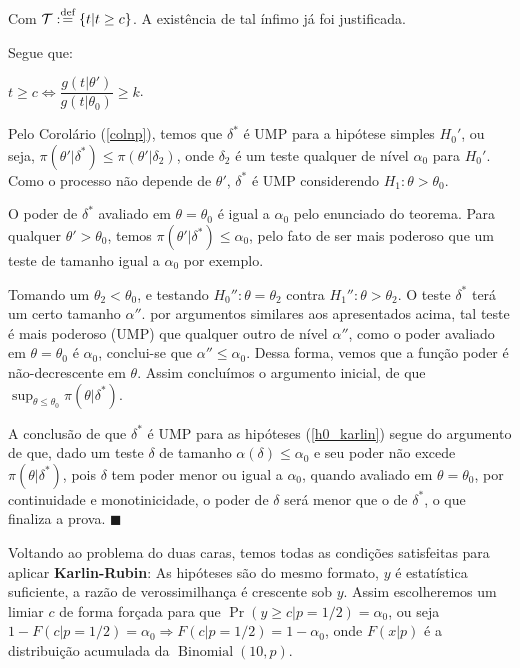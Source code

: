 \documentclass[a4paper,10pt, notitlepage]{report}
\newcommand{\pow}{^}%
\newcommand{\pr}{\operatorname{Pr}} %
\newcommand{\defn}{\stackrel{\textrm{\scriptsize def}}{=}}
\newcommand{\op}{\operatorname}
\begin{document}
\begin{enumerate}
	Com $\mathcal{T}:\defn\{t|t\geq c\}$. A existência de tal ínfimo já foi justificada.
	
	Segue que:
	
	$t\geq c\Leftrightarrow \dfrac{g(t|\theta')}{g(t|\theta_0)}\geq k$.
	
	
	\citep{scharf1991statistical}Pelo Corolário (\ref{colnp}), temos que $\delta\pow*$ é UMP para a hipótese simples $H_0'$, ou seja, $\pi(\theta'|\delta\pow*)\leq\pi(\theta'|\delta_2)$, onde $\delta_2$ é um teste qualquer de nível $\alpha_0$ para $H_0'$. Como o processo não depende de $\theta'$, $\delta\pow*$ é UMP considerendo $H_1:\theta>\theta_0$.
	
	O poder de $\delta\pow*$ avaliado em $\theta=\theta_0$ é igual a $\alpha_0$ pelo enunciado do teorema. Para qualquer $\theta'>\theta_0$, temos $\pi(\theta'|\delta\pow*)\leq\alpha_0$, pelo fato de ser mais poderoso que um teste de tamanho igual a $\alpha_0$ por exemplo.
	
	Tomando um $\theta_2<\theta_0$, e testando $H_0'':\theta=\theta_2$ contra $H_1'':\theta>\theta_2$. O teste $\delta\pow*$ terá um certo tamanho $\alpha''$.  por argumentos similares aos apresentados acima, tal teste é mais poderoso (UMP) que qualquer outro de nível $\alpha''$, como o poder avaliado em $\theta=\theta_0$ é $\alpha_0$, conclui-se que $\alpha''\leq\alpha_0$. Dessa forma, vemos que a função poder é não-decrescente em $\theta$. Assim concluímos o argumento inicial, de que $\sup_{\theta\leq\theta_0}\pi(\theta|\delta\pow*)$.
	
	A conclusão de que $\delta\pow*$ é UMP para as hipóteses (\ref{h0_karlin}) segue do argumento de que, dado um teste $\delta$ de tamanho $\alpha(\delta)\leq\alpha_0$ e seu poder não excede $\pi(\theta|\delta\pow*)$, pois $\delta$ tem poder menor ou igual a $\alpha_0$, quando avaliado em $\theta=\theta_0$, por continuidade e monotinicidade, o poder de $\delta$ será menor que o de $\delta\pow*$, o que finaliza a prova. $\blacksquare$
	
	
	Voltando ao problema do duas caras, temos todas as condições satisfeitas para aplicar \textbf{Karlin-Rubin}: As hipóteses são do mesmo formato, $y$ é estatística suficiente, a razão de verossimilhança é crescente sob $y$. Assim escolheremos um limiar $c$ de forma forçada para que $\pr(y\geq c|p=1/2)=\alpha_0$, ou seja $1-F(c|p=1/2)=\alpha_0\Rightarrow F(c|p=1/2)=1-\alpha_0$, onde $F(x|p)$ é a distribuição acumulada da $\op{Binomial}(10,p)$.
	
	\begin{table}[!htb]
		\begin{center}
	

\end{center}
\end{table}
\end{enumerate}
\end{document}
